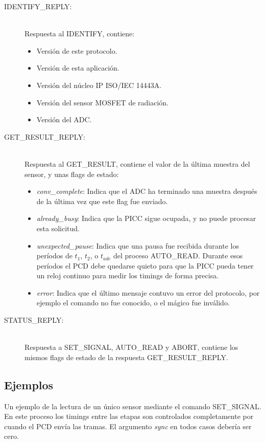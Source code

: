 \documentclass[a4paper, twoside, 11pt]{report}
\begin{document}
\begin{description}
  \item [IDENTIFY\_REPLY:] \hfill \\ Respuesta al IDENTIFY, contiene:
  \begin{itemize}
    \item Versión de este protocolo.
    \item Versión de esta aplicación.
    \item Versión del núcleo IP ISO/IEC 14443A.
    \item Versión del sensor MOSFET de radiación.
    \item Versión del ADC.
  \end{itemize}
  \item [GET\_RESULT\_REPLY:] \hfill \\ Respuesta al GET\_RESULT, contiene el valor de la última muestra del sensor, y unas flags de estado:
  \begin{itemize}
    \item \textit{conv\_complete}: Indica que el ADC ha terminado una muestra después de la última vez que este flag fue enviado.
    \item \textit{already\_busy}: Indica que la PICC sigue ocupada, y no puede procesar esta solicitud.
    \item \textit{unexpected\_pause}: Indica que una pausa fue recibida durante los períodos de $t_1$, $t_2$, o $t_{adc}$ del proceso AUTO\_READ. Durante esos períodos el PCD debe quedarse quieto para que la PICC pueda tener un reloj continuo para medir los timings de forma precisa.
    \item \textit{error}: Indica que el último mensaje contuvo un error del protocolo, por ejemplo el comando no fue conocido, o el mágico fue inválido.
  \end{itemize}
  \item [STATUS\_REPLY:] \hfill \\ Respuesta a SET\_SIGNAL, AUTO\_READ y ABORT, contiene los mismos flags de estado de la respuesta GET\_RESULT\_REPLY.
\end{description}

\FloatBarrier
\subsection{Ejemplos}

Un ejemplo de la lectura de un único sensor mediante el comando SET\_SIGNAL. En este proceso los timings entre las etapas son controlados completamente por cuando el PCD envía las tramas. El argumento \textit{sync} en todos casos debería ser cero.
\end{document}
